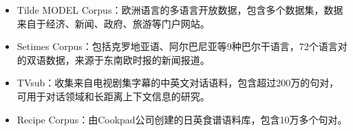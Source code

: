 \begin{appendices}
\begin{itemize}
\vspace{0.5em}
\item Tilde MODEL Corpus：欧洲语言的多语言开放数据，包含多个数据集，数据来自于经济、新闻、政府、旅游等门户网站。
\vspace{0.5em}
\item Setimes Corpus：包括克罗地亚语、阿尔巴尼亚等9种巴尔干语言，72个语言对的双语数据，来源于东南欧时报的新闻报道。
\vspace{0.5em}
\item TVsub：收集来自电视剧集字幕的中英文对话语料，包含超过200万的句对，可用于对话领域和长距离上下文信息的研究。
\vspace{0.5em}
\item Recipe Corpus：由Cookpad公司创建的日英食谱语料库，包含10万多个句对。
\end{itemize}


\end{appendices}


